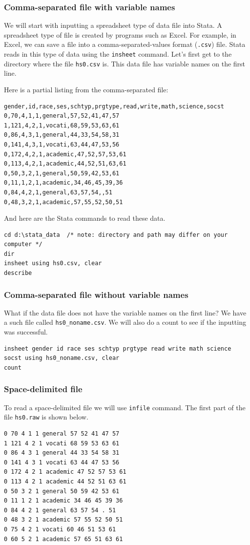 \documentclass{article}
\begin{document}
\subsubsection{Comma-separated file with variable names}
We will start with inputting a spreadsheet type of data file into Stata. A spreadsheet type of file is created by programs such as Excel. For example, in Excel, we can save a file into a comma-separated-values format (\lstinline{.csv}) file. Stata reads in this type of data using the \lstinline{insheet} command. Let's first get to the directory where the file \lstinline{hs0.csv} is. This data file has variable names on the first line.

Here is a partial listing from the comma-separated file:
\begin{lstlisting}
gender,id,race,ses,schtyp,prgtype,read,write,math,science,socst
0,70,4,1,1,general,57,52,41,47,57
1,121,4,2,1,vocati,68,59,53,63,61
0,86,4,3,1,general,44,33,54,58,31
0,141,4,3,1,vocati,63,44,47,53,56
0,172,4,2,1,academic,47,52,57,53,61
0,113,4,2,1,academic,44,52,51,63,61
0,50,3,2,1,general,50,59,42,53,61
0,11,1,2,1,academic,34,46,45,39,36
0,84,4,2,1,general,63,57,54,,51
0,48,3,2,1,academic,57,55,52,50,51
\end{lstlisting}

And here are the Stata commands to read these data.
\begin{lstlisting}
cd d:\stata_data  /* note: directory and path may differ on your computer */
dir
insheet using hs0.csv, clear
describe
\end{lstlisting}
\subsubsection{Comma-separated file without variable names}
What if the data file does not have the variable names on the first line? We have a such file called \lstinline{hs0_noname.csv}.  We will also do a count to see if the inputting was successful.

\begin{lstlisting}
insheet gender id race ses schtyp prgtype read write math science socst using hs0_noname.csv, clear
count
\end{lstlisting}

\subsubsection{Space-delimited file}
To read a space-delimited file we will use \lstinline{infile} command. The first part of the file \lstinline{hs0.raw} is shown below.
\begin{lstlisting}
0 70 4 1 1 general 57 52 41 47 57
1 121 4 2 1 vocati 68 59 53 63 61
0 86 4 3 1 general 44 33 54 58 31
0 141 4 3 1 vocati 63 44 47 53 56
0 172 4 2 1 academic 47 52 57 53 61
0 113 4 2 1 academic 44 52 51 63 61
0 50 3 2 1 general 50 59 42 53 61
0 11 1 2 1 academic 34 46 45 39 36
0 84 4 2 1 general 63 57 54 . 51
0 48 3 2 1 academic 57 55 52 50 51
0 75 4 2 1 vocati 60 46 51 53 61
0 60 5 2 1 academic 57 65 51 63 61
\end{lstlisting}
\end{document}
